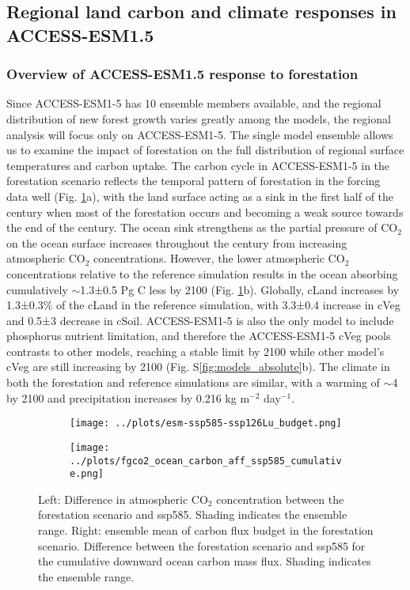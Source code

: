 \documentclass[]{article}
\begin{document}
\subsection{Regional land carbon and climate responses in ACCESS-ESM1.5}

\subsubsection{Overview of ACCESS-ESM1.5 response to forestation}

Since ACCESS-ESM1-5 has 10 ensemble members available, and the regional distribution of new forest growth varies greatly among the models, the regional analysis will focus only on ACCESS-ESM1-5.
The single model ensemble allows us to examine the impact of forestation on the full distribution of regional surface temperatures and carbon uptake.
The carbon cycle in ACCESS-ESM1-5 in the forestation scenario reflects the temporal pattern of forestation in the forcing data well (Fig. \ref{fig:global_carbon_budget}a), with the land surface acting as a sink in the first half of the century when most of the forestation occurs and becoming a weak source towards the end of the century.
The ocean sink strengthens as the partial pressure of CO$_2$ on the ocean surface increases throughout the century from increasing atmospheric CO$_2$ concentrations.
However, the lower atmospheric CO$_2$ concentrations relative to the reference simulation results in the ocean absorbing cumulatively $\sim$1.3±0.5 Pg C less by 2100 (Fig. \ref{fig:global_carbon_budget}b).
Globally, cLand increases by 1.3±0.3\% of the cLand in the reference simulation, with 3.3±0.4 increase in cVeg and 0.5±3 decrease in cSoil.
ACCESS-ESM1-5 is also the only model to include phosphorus nutrient limitation, and therefore the ACCESS-ESM1-5 cVeg pools contrasts to other models, reaching a stable limit by 2100 while other model's cVeg are still increasing by 2100 (Fig. S\ref{fig:models_absolute}b).
The climate in both the forestation and reference simulations are similar, with a warming of $\sim$4 \textcelsius{} by 2100 and precipitation increases by 0.216 kg m$^{-2}$ day$^{-1}$.

\begin{figure}[H]
    \centering
    \begin{subfigure}[b]{0.4\linewidth}
        \texttt{[image: ../plots/esm-ssp585-ssp126Lu\_budget.png]}
    \end{subfigure}
    \begin{subfigure}[b]{0.4\linewidth}
        \texttt{[image: ../plots/fgco2\_ocean\_carbon\_aff\_ssp585\_cumulative.png]}
    \end{subfigure}
    \caption{Left: Difference in atmospheric CO$_2$ concentration between the forestation scenario and ssp585. Shading indicates the ensemble range. Right: ensemble mean of carbon flux budget in the forestation scenario. Difference between the forestation scenario and ssp585 for the cumulative downward ocean carbon mass flux. Shading indicates the ensemble range.}
    \label{fig:global_carbon_budget}
\end{figure}
\end{document}
